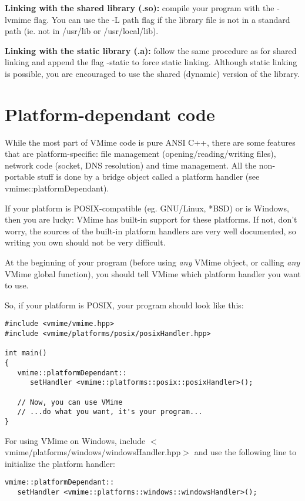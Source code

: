{\bf Linking with the shared library (.so):} compile your program with the
{\vcode -lvmime} flag. You can use the -L path flag if the library file is
not in a standard path (ie. not in /usr/lib or /usr/local/lib).


{\bf Linking with the static library (.a):} follow the same procedure as for
shared linking and append the flag -static to force static linking. Although
static linking is possible, you are encouraged to use the shared (dynamic)
version of the library.


\section{Platform-dependant code}

While the most part of VMime code is pure ANSI C++, there are some features
that are platform-specific: file management (opening/reading/writing files),
network code (socket, DNS resolution) and time management. All the
non-portable stuff is done by a bridge object called a platform handler (see
{\vcode vmime::platformDependant}).

If your platform is POSIX-compatible (eg. GNU/Linux, *BSD) or is Windows,
then you are lucky: VMime has built-in support for these platforms. If not,
don't worry, the sources of the built-in platform handlers are very well
documented, so writing you own should not be very difficult.

At the beginning of your program (before using \emph{any} VMime object, or
calling \emph{any} VMime global function), you should tell VMime which
platform handler you want to use.

So, if your platform is POSIX, your program should look like this:

\begin{lstlisting}[caption={Initializing VMime and the platform handler}]
#include <vmime/vmime.hpp>
#include <vmime/platforms/posix/posixHandler.hpp>

int main()
{
   vmime::platformDependant::
      setHandler <vmime::platforms::posix::posixHandler>();

   // Now, you can use VMime
   // ...do what you want, it's your program...
}
\end{lstlisting}

For using VMime on Windows, include
$<$vmime/platforms/windows/windowsHandler.hpp$>$ and use the following line
to initialize the platform handler:

\begin{lstlisting}
vmime::platformDependant::
   setHandler <vmime::platforms::windows::windowsHandler>();
\end{lstlisting}

